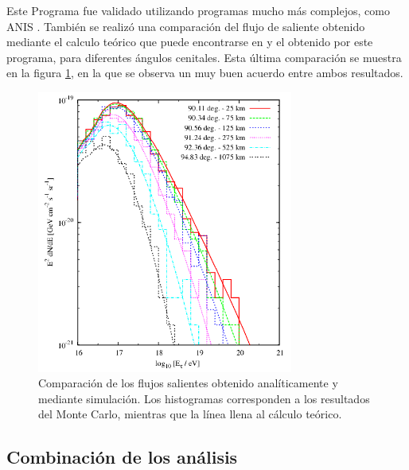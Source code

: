 	Este Programa fue validado utilizando programas mucho m\'as complejos, como ANIS \cite{anis}.
	Tambi\'en se realiz\'o una comparaci\'on del flujo de \tauon{} saliente obtenido mediante el calculo te\'orico que puede encontrarse en \cite{prop_tau} y el obtenido por este programa, para diferentes \'angulos cenitales.
	Esta \'ultima comparaci\'on se muestra en la figura \ref{fig:comp_tau_mc_teo}, en la que se observa un muy buen acuerdo entre ambos resultados.
	\begin{figure}[h!]
		\begin{center}
		\includegraphics[width=0.75\textwidth]{fig/simulacionAuger/comp_tau_mc_teo}
		\caption{\label{fig:comp_tau_mc_teo} Comparaci\'on de los flujos salientes obtenido anal\'iticamente y mediante simulaci\'on. Los histogramas corresponden a los resultados del Monte Carlo, mientras que la l\'inea llena al c\'alculo te\'orico.}
		\end{center}
	\end{figure}
	
	
	\subsection{Combinaci\'on de los an\'alisis}
	
